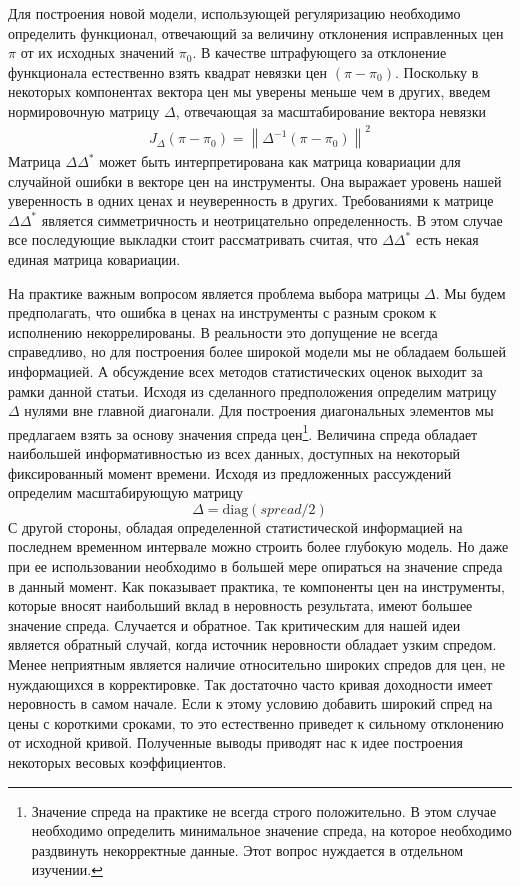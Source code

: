 \documentclass[10pt]{article}
\theoremstyle{definition}
\theoremstyle{remark}
\theoremstyle{plain}
\newcommand{\diag}{\mathrm{diag}}
\begin{document}
Для построения новой модели, использующей регуляризацию необходимо определить функционал, отвечающий за величину отклонения исправленных цен $\pi$ от их исходных значений $\pi_0$. В качестве штрафующего за отклонение функционала естественно взять квадрат невязки цен $(\pi - \pi_0)$. Поскольку в некоторых компонентах вектора цен мы уверены меньше чем в других, введем нормировочную матрицу $\Delta$, отвечающая за масштабирование вектора невязки
\begin{align*}
J_{\Delta}(\pi-\pi_0) = \left\|\Delta^{-1}(\pi - \pi_0)\right\|^2 
\end{align*}
 Матрица $\Delta\Delta^*$ может быть интерпретирована как матрица ковариации для случайной ошибки в векторе цен на инструменты. Она выражает уровень нашей уверенность в одних ценах и неуверенность в других. Требованиями к матрице $\Delta\Delta^*$ является симметричность и неотрицательно определенность. В этом случае все последующие выкладки стоит рассматривать считая, что $\Delta\Delta^*$ есть некая единая матрица ковариации.
 
 На практике важным вопросом является проблема выбора матрицы $\Delta$. Мы будем предполагать, что ошибка в ценах на инструменты с разным сроком к исполнению некоррелированы. В реальности это допущение не всегда справедливо, но для построения более широкой модели мы не обладаем большей информацией. А обсуждение всех методов статистических оценок выходит за рамки данной статьи. Исходя из сделанного предположения определим матрицу $\Delta$ нулями вне главной диагонали. Для построения диагональных элементов мы предлагаем взять за основу значения спреда цен\footnote{Значение спреда на практике не всегда строго положительно. В этом случае необходимо определить минимальное значение спреда, на которое необходимо раздвинуть некорректные данные. Этот вопрос нуждается в отдельном изучении.}.
Величина спреда обладает наибольшей информативностью из всех данных, доступных на некоторый фиксированный момент времени. Исходя из предложенных рассуждений определим масштабирующую матрицу $$\Delta = \diag(spread/2)$$
С другой стороны, обладая определенной статистической информацией на последнем временном интервале можно строить более глубокую модель. Но даже при ее использовании необходимо в большей мере опираться на значение спреда в данный момент. Как показывает практика, те компоненты цен на инструменты, которые вносят наибольший вклад в неровность результата, имеют большее значение спреда. Случается и обратное. Так критическим для нашей идеи является обратный случай, когда источник неровности обладает узким спредом. Менее неприятным является наличие относительно широких спредов для цен, не нуждающихся в корректировке. Так достаточно часто кривая доходности имеет неровность в самом начале. Если к этому условию добавить широкий спред на цены с короткими сроками, то это естественно приведет к сильному отклонению от исходной кривой. Полученные выводы приводят нас к идее построения некоторых весовых коэффициентов. 
\end{document}
